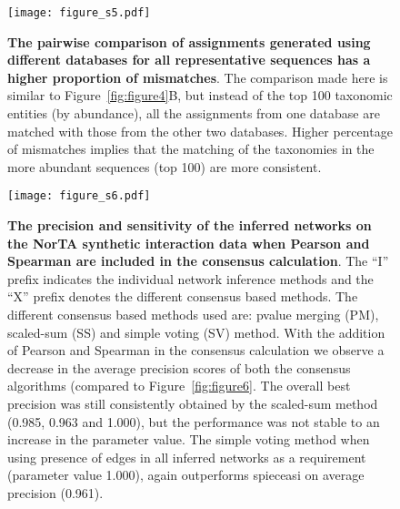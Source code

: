     \begin{figure}[H]
      \centering
      \texttt{[image: figure\_s5.pdf]}
    \end{figure}
    \begin{figure}[H]
      \centering
        \caption{
          \textbf{The pairwise comparison of assignments generated using different databases for all representative sequences has a higher proportion of mismatches}.
          The comparison made here is similar to Figure~\ref{fig:figure4}B, but instead of the top 100 taxonomic entities (by abundance), all the assignments from one database are matched with those from the other two databases.
          Higher percentage of mismatches implies that the matching of the taxonomies in the more abundant sequences (top 100) are more consistent.
        }
      \label{fig:figure_s5}
    \end{figure}
    \FloatBarrier
    \newpage

  \begin{figure}[H]
    \centering
    \texttt{[image: figure\_s6.pdf]}
  \end{figure}
  \begin{figure}[H]
    \centering
      \caption{
        \textbf{The precision and sensitivity of the inferred networks on the NorTA synthetic interaction data when Pearson and Spearman are included in the consensus calculation}.
        The ``I'' prefix indicates the individual network inference methods and the ``X'' prefix denotes the different consensus based methods.
        The different consensus based methods used are: pvalue merging (PM), scaled-sum (SS) and simple voting (SV) method.
        With the addition of Pearson and Spearman in the consensus calculation we observe a decrease in the average precision scores of both the consensus algorithms (compared to Figure~\ref{fig:figure6}.
        The overall best precision was still consistently obtained by the scaled-sum method (0.985, 0.963 and 1.000), but the performance was not stable to an increase in the parameter value.
        The simple voting method when using presence of edges in all inferred networks as a requirement (parameter value 1.000), again outperforms \ac{spieceasi} on average precision (0.961).
      }
    \label{fig:figure_s6}
  \end{figure}
  \FloatBarrier
  \newpage

